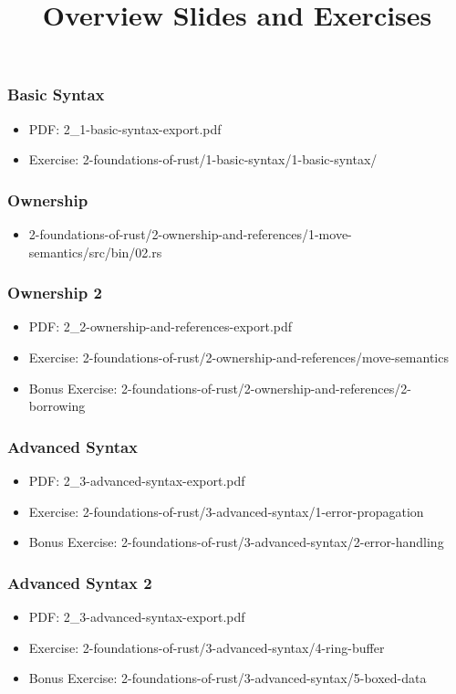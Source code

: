 \documentclass{beamer}
\title{Overview Slides and Exercises}
\begin{document}
	
\frame{\titlepage}



\begin{frame}
	\frametitle{Basic Syntax}
	\begin{itemize}
		\item PDF: 2\_1-basic-syntax-export.pdf
		\item Exercise: 2-foundations-of-rust/1-basic-syntax/1-basic-syntax/
	\end{itemize}
\end{frame}
	
\begin{frame}
	\frametitle{Ownership}
	\begin{itemize}
		\item 2-foundations-of-rust/2-ownership-and-references/1-move-semantics/src/bin/02.rs
	\end{itemize}
\end{frame}
	
\begin{frame}
	\frametitle{Ownership 2}
	\begin{itemize}
		\item PDF: 2\_2-ownership-and-references-export.pdf
		\item Exercise: 2-foundations-of-rust/2-ownership-and-references/move-semantics
		\item Bonus Exercise: 2-foundations-of-rust/2-ownership-and-references/2-borrowing
	\end{itemize}
\end{frame}

\begin{frame}
	\frametitle{Advanced Syntax}
	\begin{itemize}
		\item PDF: 2\_3-advanced-syntax-export.pdf
		\item Exercise: 2-foundations-of-rust/3-advanced-syntax/1-error-propagation
		\item Bonus Exercise: 2-foundations-of-rust/3-advanced-syntax/2-error-handling
	\end{itemize}
\end{frame}

\begin{frame}
	\frametitle{Advanced Syntax 2}
	\begin{itemize}
		\item PDF: 2\_3-advanced-syntax-export.pdf
		\item Exercise: 2-foundations-of-rust/3-advanced-syntax/4-ring-buffer
		\item Bonus Exercise: 2-foundations-of-rust/3-advanced-syntax/5-boxed-data
	\end{itemize}
\end{frame}
\end{document}

